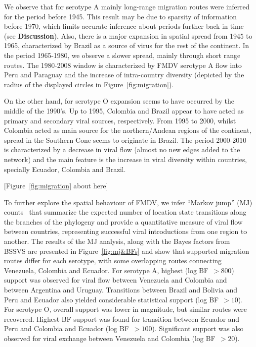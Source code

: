 \documentclass[10pt]{article}
\begin{document}
We observe that for serotype A mainly long-range migration routes were inferred for the period before 1945.
This result may be due to sparsity of information before 1970, which limits accurate inference about periods further back in time (see {\bf Discussion}). 
Also, there is a major expansion in spatial spread from 1945 to 1965, characterized by Brazil as a source of virus for the rest of the continent.
In the period 1965-1980, we observe a slower spread, mainly through short range routes.
The 1980-2008 window is characterized by FMDV serotype A flow into Peru and Paraguay and the increase of intra-country diversity (depicted by the radius of the displayed circles in Figure~\ref{fig:migration}).   

On the other hand, for serotype O expansion seems to have occurred by the middle of the 1990's.
Up to 1995, Colombia and Brazil appear to have acted as primary and secondary viral sources, respectively.
From 1995 to 2000, whilst Colombia acted as main source for the northern/Andean regions of the continent, spread in the Southern Cone seems to originate in Brazil.
The period 2000-2010 is characterized by a decrease in viral flow (almost no new edges added to the network) and the main feature is the increase in viral diversity within countries, specially Ecuador, Colombia and Brazil.

\begin{center}
 [Figure~\ref{fig:migration} about here]
\end{center}

To further explore the spatial behaviour of FMDV, we infer ``Markov jump'' (MJ) counts~\cite{Minin2008} that summarize the expected number of location state transitions along the  branches of the phylogeny and provide a quantitative measure of viral flow between countries, representing successful viral introductions from one region to another.
The results of the MJ analysis, along with the Bayes factors from BSSVS are presented in Figure~\ref{fig:mj&BFs} and show that supported migration routes differ for each serotype, with some overlapping routes connecting Venezuela, Colombia and Ecuador.
For serotype A, highest (log BF~$>800$) support was observed for viral flow between Venezuela and Colombia and between Argentina and Uruguay.
Transitions between Brazil and Bolivia and Peru and Ecuador also yielded considerable statistical support (log BF~$>10$).
For serotype O, overall support was lower in magnitude, but similar routes were recovered.
Highest BF support was found for transition between Ecuador and Peru and Colombia and Ecuador (log BF~$>100$). Significant support was also observed for viral exchange between Venezuela and Colombia (log BF~$>20$). 
\end{document}
